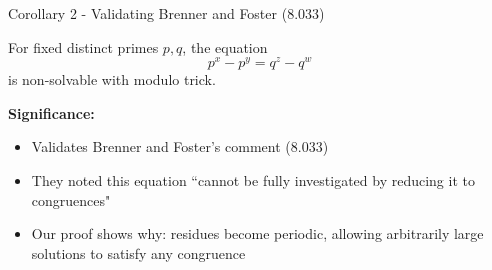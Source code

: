\begin{frame}{Corollary 2 - Validating Brenner and Foster (8.033)}
    \begin{corollarys}
        For fixed distinct primes $p,q$, the equation
        \[p^x - p^y = q^z - q^w\]
        is non-solvable with modulo trick.
    \end{corollarys}
    
    \vspace{0.3cm}
    \textbf{Significance:}
    \begin{itemize}
        \item Validates Brenner and Foster's comment (8.033)
        \item They noted this equation ``cannot be fully investigated by reducing it to congruences"
        \item Our proof shows why: residues become periodic, allowing arbitrarily large solutions to satisfy any congruence
    \end{itemize}
\end{frame}

